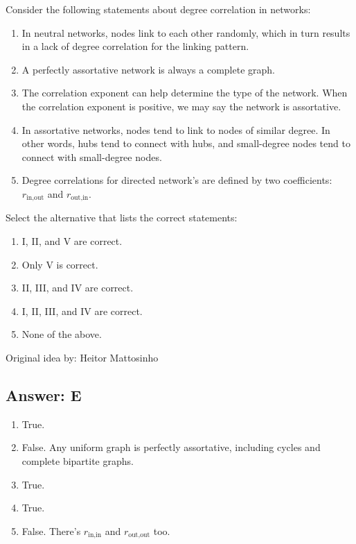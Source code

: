 
Consider the following statements about degree correlation in networks:

\begin{enumerate}[label={\Roman*.}]
    \item In neutral networks, nodes link to each other randomly, which in turn results in a lack of degree correlation for the linking pattern.
    \item A perfectly assortative network is always a complete graph.
    \item The correlation exponent can help determine the type of the network. When the correlation exponent is positive, we may say the network is assortative.
    \item In assortative networks, nodes tend to link to nodes of similar degree. In other words, hubs tend to connect with hubs, and small-degree nodes tend to connect with small-degree nodes.
    \item Degree correlations for directed network's are defined by two coefficients: $r_{\text{in},\text{out}}$ and $r_{\text{out},\text{in}}$.
\end{enumerate}

Select the alternative that lists the correct statements:

\begin{enumerate}[label={\Alph*.}]
    \item I, II, and V are correct.
    \item Only V is correct.
    \item II, III, and IV are correct.
    \item I, II, III, and IV are correct.
    \item None of the above.
\end{enumerate}

Original idea by: Heitor Mattosinho


\subsection*{Answer: E}

\begin{enumerate}[label={\Roman*.}]
    \item True.
    \item False. Any uniform graph is perfectly assortative, including cycles and complete bipartite graphs.
    \item True.
    \item True.
    \item False. There's $r_{\text{in},\text{in}}$ and $r_{\text{out},\text{out}}$ too.
\end{enumerate}
